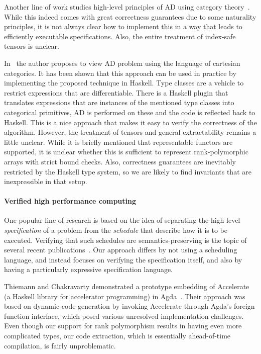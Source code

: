 Another line of work studies high-level principles of AD using
category theory~\cite{ad-theor1, ad-theor2, ad-theor3}.
While this indeed comes with great correctness guarantees due to
some naturality principles, it is not always clear how to implement
this in a way that leads to efficiently executable specifications.  Also, the
entire treatment of index-safe tensors is unclear.

In~\cite{ad-elliott} the author proposes to view AD problem using
the language of cartesian categories.  It has been shown that
this approach can be used in practice by implementing the proposed
technique in Haskell.  Type classes are a vehicle to restrict expressions
that are differentiable.  There is a Haskell plugin that translates
expressions that are instances of the mentioned type classes into
categorical primitives, AD is performed on these and the code is reflected
back to Haskell.  This is a nice approach that makes it easy
to verify the correctness of the algorithm.  However, the treatment
of tensors and general extractability remains a little unclear.
While it is briefly mentioned that representable functors
are supported, it is unclear whether this is sufficient to
represent rank-polymorphic arrays with strict bound checks.
Also, correctness guarantees are inevitably restricted by the
Haskell type system, so we are likely to find invariants that
are inexpressible in that setup.

\paragraph{Verified high performance computing}

One popular line of research is based on the idea of separating the
high level \emph{specification} of a problem from the \emph{schedule}
that describe how it is to be executed. Verifying that such schedules
are semantics-preserving is the topic of several recent
publications~\cite{10.1145/3527328,10.1145/3498717}. Our approach
differs by not using a scheduling language, and instead focuses on
verifying the specification itself, and also by having a particularly
expressive specification language.

Thiemann and Chakravarty demonstrated a prototype embedding of
Accelerate~\cite{10.1145/1926354.1926358} (a Haskell library for
accelerator programming) in Agda~\cite{thiemann2013agda}. Their
approach was based on dynamic code generation by invoking Accelerate
through Agda's foreign function interface, which posed various
unresolved implementation challenges. Even though our support for rank
polymorphism results in having even more complicated types, our code
extraction, which is essentially ahead-of-time compilation, is fairly
unproblematic.

